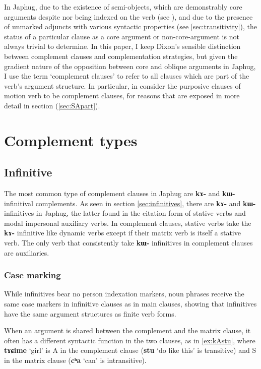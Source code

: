 \documentclass[oldfontcommands,oneside,a4paper,11pt]{article}
\newcommand{\ipa}[1]{\textbf{\phon#1}} %
\newcommand{\jpg}[2]{\ipa{#1} `#2'} %
\begin{document}
In Japhug, due to the existence of semi-objects, which are demonstrably core arguments despite nor being indexed on the verb (see \citet{jacques16relatives}), and due to the presence of unmarked adjuncts with various syntactic properties (see \ref{sec:transitivity}), the status of a particular clause as a core argument or non-core-argument is not always trivial to determine. In this paper, I keep Dixon's sensible distinction between complement clauses and complementation strategies, but given the gradient nature of the opposition between core and oblique arguments in Japhug, I use the term `complement clauses' to refer to all clauses which are part of the verb's argument structure. In particular, in consider the purposive clauses of motion verb to be complement clauses, for reasons that are exposed in more detail in section (\ref{sec:SApart}).
 

\section{Complement types}


\subsection{Infinitive} \label{sec:infinitives.compl}
The most common type of complement clauses in Japhug are \ipa{kɤ-} and \ipa{kɯ-} infinitival complements. As seen in section \ref{sec:infinitives}, there are \ipa{kɤ-} and \ipa{kɯ-} infinitives in Japhug, the latter found in the citation form of stative verbs and modal impersonal auxiliary verbs. In complement clauses, stative verbs take the \ipa{kɤ-} infinitive like dynamic verbs except if their matrix verb is itself a stative verb. The only verb that consistently take \ipa{kɯ-} infinitives in complement clauses are auxiliaries.

\subsubsection{Case marking} \label{sec:case.infinitive}
While infinitives bear no person indexation markers, noun phrases receive the same case markers in infinitive clauses as in main clauses, showing that infinitives have the same argument structures as finite verb forms.

When an argument is shared between the complement and the matrix clause, it often has a different syntactic function in the two clauses, as in \ref{ex:kAstu}, where \ipa{tɤɕime} `girl' is A in the complement clause (\jpg{stu}{do like this} is transitive) and S in the matrix clause (\jpg{cʰa}{can} is intransitive). 
\end{document}
